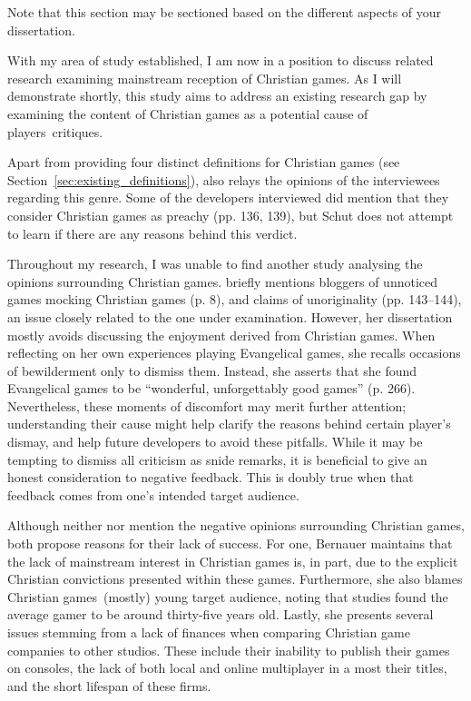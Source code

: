   Note that this section may be sectioned based on the different aspects of your dissertation.
\fi

With my area of study established, I am now in a position to discuss related research examining mainstream reception of Christian games. As I will demonstrate shortly, this study aims to address an existing research gap by examining the content of Christian games as a potential cause of players\textquotesingle\ critiques.

Apart from providing four distinct definitions for Christian games (see Section~\ref{sec:existing_definitions}), \textcite{schut_making_2013} also relays the opinions of the interviewees regarding this genre. Some of the developers interviewed did mention that they consider Christian games as preachy (pp. 136, 139), but Schut does not attempt to learn if there are any reasons behind this verdict.

Throughout my research, I was unable to find another study analysing the opinions surrounding Christian games. \textcite{gonzalez_born-again_2014} briefly mentions bloggers of unnoticed games mocking Christian games (p. 8), and claims of unoriginality (pp. 143--144), an issue closely related to the one under examination. However, her dissertation mostly avoids discussing the enjoyment derived from Christian games. When reflecting on her own experiences playing Evangelical games, she recalls occasions of bewilderment only to dismiss them. Instead, she asserts that she found Evangelical games to be ``wonderful, unforgettably good games'' (p. 266). Nevertheless, these moments of discomfort may merit further attention; understanding their cause might help clarify the reasons behind certain player's dismay, and help future developers to avoid these pitfalls. While it may be tempting to dismiss all criticism as snide remarks, it is beneficial to give an honest consideration to negative feedback. This is doubly true when that feedback comes from one's intended target audience.

Although neither \textcite{bernauer_playing_2012} nor \textcite{schut_swords_2026} mention the negative opinions surrounding Christian games, both propose reasons for their lack of success. For one, Bernauer maintains that the lack of mainstream interest in Christian games is, in part, due to the explicit Christian convictions presented within these games. Furthermore, she also blames Christian games\textquotesingle\ (mostly) young target audience, noting that studies found the average gamer to be around thirty-five years old. Lastly, she presents several issues stemming from a lack of finances when comparing Christian game companies to other studios. These include their inability to publish their games on consoles, the lack of both local and online multiplayer in a most their titles, and the short lifespan of these firms.


